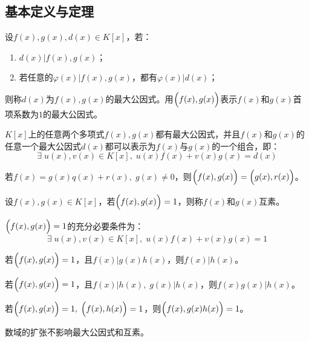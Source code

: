 \subsection{基本定义与定理}
\begin{definition}
	设$f(x),g(x),d(x)\in K[x]$，若：
	\begin{enumerate}
		\item $d(x)|f(x),g(x)$；
		\item 若任意的$\varphi(x)|f(x),g(x)$，都有$\varphi(x)|d(x)$；
	\end{enumerate}
	则称$d(x)$为$f(x),g(x)$的最大公因式。用$\Bigl(f(x),g(x)\Bigr)$表示$f(x)$和$g(x)$首项系数为$1$的最大公因式。
\end{definition}
\begin{theorem}[最大公因式定理]
	$K[x]$上的任意两个多项式$f(x),g(x)$都有最大公因式，并且$f(x)$和$g(x)$的任意一个最大公因式$d(x)$都可以表示为$f(x)$与$g(x)$的一个组合，即：
	\begin{equation*}
		\exists\;u(x),v(x)\in K[x],\;u(x)f(x)+v(x)g(x)=d(x)
	\end{equation*}
\end{theorem}
\begin{theorem}
	若$f(x)=g(x)q(x)+r(x),\;g(x)\ne 0$，则$\Bigl(f(x),g(x)\Bigr)=\Bigl(g(x),r(x)\Bigr)$。
\end{theorem}
\begin{definition}
	设$f(x),g(x)\in K[x]$，若$\Bigl(f(x),g(x)\Bigr)=1$，则称$f(x)$和$g(x)$互素。
\end{definition}
\begin{theorem}
	$\Bigl(f(x),g(x)\Bigr)=1$的充分必要条件为：
	\begin{equation*}
		\exists\;u(x),v(x)\in K[x],\;u(x)f(x)+v(x)g(x)=1
	\end{equation*}
\end{theorem}
\begin{theorem}
	若$\Bigl(f(x),g(x)\Bigr)=1$，且$f(x)|g(x)h(x)$，则$f(x)|h(x)$。
\end{theorem}
\begin{theorem}
	若$\Bigl(f(x),g(x)\Bigr)=1$，且$f(x)|h(x),\;g(x)|h(x)$，则$f(x)g(x)|h(x)$。
\end{theorem}
\begin{theorem}\label{theo:CoprimeProduct}
	若$\Bigl(f(x),g(x)\Bigr)=1,\;\Bigl(f(x),h(x)\Bigr)=1$，则$\Bigl(f(x),g(x)h(x)\Bigr)=1$。
\end{theorem}
\begin{theorem}
	数域的扩张不影响最大公因式和互素。
\end{theorem}

